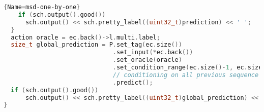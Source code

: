 \begin{appendix}
\begin{lstlisting}[language=C++,
                   basicstyle=\scriptsize\ttfamily]{Name=msd-one-by-one}
    if (sch.output().good())
      sch.output() << sch.pretty_label((uint32_t)prediction) << ' ';
  }
  action oracle = ec.back()->l.multi.label;
  size_t global_prediction = P.set_tag(ec.size())
                              .set_input(*ec.back())
                              .set_oracle(oracle)
                              .set_condition_range(ec.size()-1, ec.size()-1, 'a')
                              // conditioning on all previous sequence decisions
                              .predict();
  if (sch.output().good())
      sch.output() << sch.pretty_label((uint32_t)global_prediction) << ' ';
}
\end{lstlisting}
\end{appendix}
